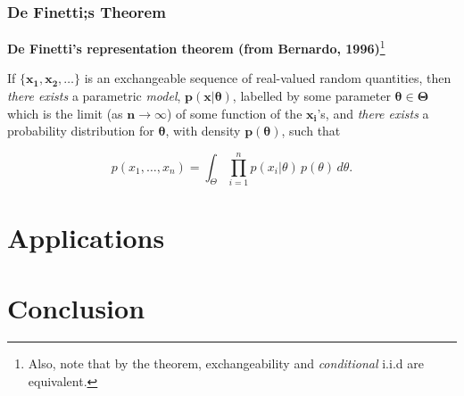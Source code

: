 \documentclass{beamer}
\begin{document}
\begin{frame}
    \frametitle{De Finetti;s Theorem}

    \vfill
    
    \textbf{De Finetti's representation theorem (from Bernardo, 1996)}\footnote{
    Also, note that by the theorem, exchangeability and \emph{conditional} i.i.d are equivalent.}

    \vfill

    If $\boldsymbol{\{x_1, x_2, \ldots\}}$ is an exchangeable sequence of real-valued random quantities,
    then \emph{there exists} a parametric \emph{model}, $\boldsymbol{p(x | \theta)}$, labelled by some
    parameter $\boldsymbol{\theta \in \Theta}$ which is the limit (as $\boldsymbol{n \to \infty}$)
    of some function of the $\boldsymbol{x_i}$'s, and \emph{there exists} a probability distribution
    for $\boldsymbol{\theta}$, with density $\boldsymbol{p(\theta)}$, such that

    \[p(x_1, \ldots, x_n) = \int_{\Theta} \prod_{i = 1}^{n} p(x_i | \theta) \, p(\theta) \, d\theta.\]
\end{frame}






\section{Applications}



\section{Conclusion}
\end{document}
